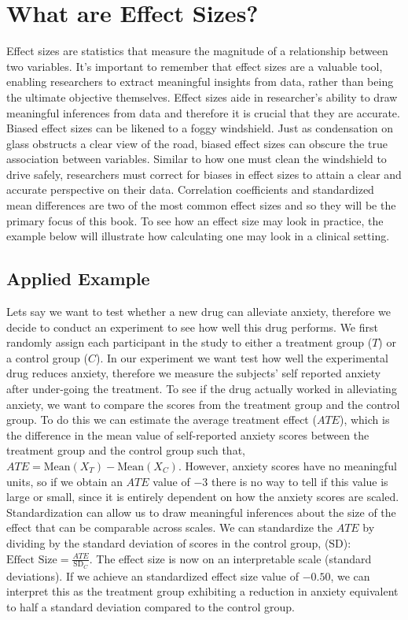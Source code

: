 \documentclass[
  letterpaper,
  DIV=11,
  numbers=noendperiod]{scrreprt}
\begin{document}
\hypertarget{what-are-effect-sizes}{%
\section{What are Effect Sizes?}\label{what-are-effect-sizes}}

Effect sizes are statistics that measure the magnitude of a relationship
between two variables. It's important to remember that effect sizes are
a valuable tool, enabling researchers to extract meaningful insights
from data, rather than being the ultimate objective themselves. Effect
sizes aide in researcher's ability to draw meaningful inferences from
data and therefore it is crucial that they are accurate. Biased effect
sizes can be likened to a foggy windshield. Just as condensation on
glass obstructs a clear view of the road, biased effect sizes can
obscure the true association between variables. Similar to how one must
clean the windshield to drive safely, researchers must correct for
biases in effect sizes to attain a clear and accurate perspective on
their data. Correlation coefficients and standardized mean differences
are two of the most common effect sizes and so they will be the primary
focus of this book. To see how an effect size may look in practice, the
example below will illustrate how calculating one may look in a clinical
setting.

\hypertarget{applied-example}{%
\subsection{Applied Example}\label{applied-example}}

Lets say we want to test whether a new drug can alleviate anxiety,
therefore we decide to conduct an experiment to see how well this drug
performs. We first randomly assign each participant in the study to
either a treatment group (\(T\)) or a control group (\(C\)). In our
experiment we want test how well the experimental drug reduces anxiety,
therefore we measure the subjects' self reported anxiety after
under-going the treatment. To see if the drug actually worked in
alleviating anxiety, we want to compare the scores from the treatment
group and the control group. To do this we can estimate the average
treatment effect (\(ATE\)), which is the difference in the mean value of
self-reported anxiety scores between the treatment group and the control
group such that, \(ATE = \text{Mean}(X_T) - \text{Mean}(X_C)\). However,
anxiety scores have no meaningful units, so if we obtain an \(ATE\)
value of \(-3\) there is no way to tell if this value is large or small,
since it is entirely dependent on how the anxiety scores are scaled.
Standardization can allow us to draw meaningful inferences about the
size of the effect that can be comparable across scales. We can
standardize the \(ATE\) by dividing by the standard deviation of scores
in the control group, (\(\text{SD}\)):
\(\text{Effect Size} = \frac{ATE}{\text{SD}_C}\). The effect size is now
on an interpretable scale (standard deviations). If we achieve an
standardized effect size value of \(-0.50\), we can interpret this as
the treatment group exhibiting a reduction in anxiety equivalent to half
a standard deviation compared to the control group.
\end{document}

